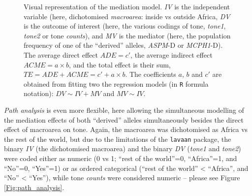 \documentclass[twoside,twocolumn]{article}
\begin{document}
\begin{figure}[h]
  \centering


  \caption{Visual representation of the mediation model. \textit{IV} is the independent variable (here, dichotomised \textit{macroarea}: inside vs outside Africa, \textit{DV} is the outcome of interest (here, the various codings of tone, \textit{tone1}, \textit{tone2} or tone \textit{counts}), and \textit{MV} is the mediator (here, the population frequency of one of the ``derived'' alleles, \textit{ASPM}-D or \textit{MCPH1}-D). The average direct effect $ADE = c'$, the average indirect effect $ACME = a \times b$, and the total effect is their sum, $TE = ADE + ACME = c' + a \times b$. The coefficients $a$, $b$ and $c'$ are obtained from fitting two the regression models (in \texttt{R} formula notation): $DV \sim IV + MV$ and $MV \sim IV$.}
  \label{Fig:mediation_analysis}
\end{figure}

\emph{Path analysis} \citep{kline_principles_2011} is even more flexible, here allowing the simultaneous modelling of the mediation effects of both ``derived'' alleles simultaneously besides the direct effect of macroarea on tone.
Again, the macroarea was dichotomised as Africa vs the rest of the world, but due to the limitations of the \texttt{lavaan} package, the binary \textit{IV} (the dichotomised macroarea) and the binary \textit{DV} (\textit{tone1} and \textit{tone2}) were coded either as numeric (0 vs 1; ``rest of the world''=0, ``Africa''=1, and ``No''=0, ``Yes''=1) or as ordered categorical (``rest of the world'' < ``Africa'', and ``No'' < ``Yes''), while tone \textit{counts} were considered numeric -- please see Figure \ref{Fig:path_analysis}.
\end{document}
